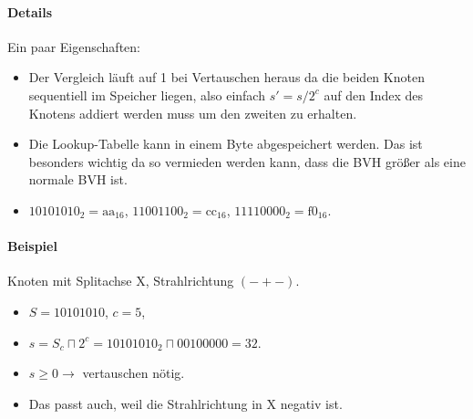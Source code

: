 \documentclass[a4paper,11pt]{article}
\begin{document}
\paragraph{Details}
Ein paar Eigenschaften:
\begin{itemize}
\item Der Vergleich läuft auf 1 bei Vertauschen heraus da die beiden Knoten sequentiell im Speicher liegen, also einfach $s'=s/2^c$
		auf den Index des Knotens addiert werden muss um den zweiten zu erhalten.
\item Die Lookup-Tabelle kann in einem Byte abgespeichert werden. Das ist besonders wichtig da so vermieden werden kann, 
		dass die BVH größer als eine normale BVH ist.
\item $10101010_2 = \text{aa}_{16}$, $11001100_2 = \text{cc}_{16}$, $11110000_2 = \text{f0}_{16}$.
\end{itemize}

\paragraph{Beispiel}
Knoten mit Splitachse X, Strahlrichtung $(- + -)$.
\begin{itemize}
\item $S=10101010$, $c=5$,
\item $s = S_c \sqcap 2^c = 10101010_2 \sqcap 00100000 = 32$.
\item $s\ge0 \to$ vertauschen nötig.
\item Das passt auch, weil die Strahlrichtung in X negativ ist.
\end{itemize}






\end{document}
